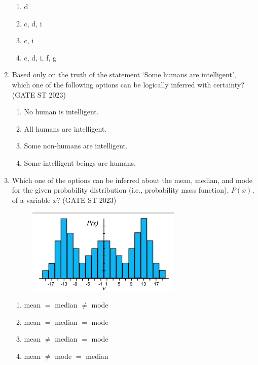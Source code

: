 \documentclass[journal]{IEEEtran}
\begin{document}
\begin{enumerate}[label=\textbf{Q.\arabic*.}, start=1, align=left, itemsep=2em]
\begin{enumerate}
    \item d
    \item c, d, i
    \item c, i
    \item c, d, i, f, g
\end{enumerate}




\item Based only on the truth of the statement `Some humans are intelligent', which one of the following options can be logically inferred with certainty? \hfill(GATE ST 2023)

\begin{enumerate}
    \item No human is intelligent.
    \item All humans are intelligent.
    \item Some non-humans are intelligent.
    \item Some intelligent beings are humans.
\end{enumerate}

\item Which one of the options can be inferred about the mean, median, and mode for the given probability distribution (i.e., probability mass function), $P(x)$, of a variable $x$? \hfill(GATE ST 2023)\\

    \begin{figure}[h]
        \centering
        \includegraphics[width=0.5\columnwidth]{figs/Q.7image.png}        
        \label{fig:placeholder}
    \end{figure}
    
\begin{enumerate}
    \item mean $=$ median $\neq$ mode
    \item mean $=$ median $=$ mode
    \item mean $\neq$ median $=$ mode
    \item mean $\neq$ mode $=$ median
\end{enumerate}


\end{enumerate}
\end{document}
